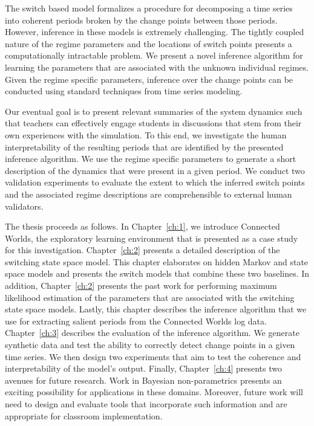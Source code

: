 The switch based model formalizes a procedure for decomposing a time series into coherent periods broken by the change points between those periods. However, inference in these models is extremely challenging. The tightly coupled nature of the regime parameters and the locations of switch points presents a computationally intractable problem. We present a novel inference algorithm for learning the parameters that are associated with the unknown individual regimes. Given the regime specific parameters, inference over the change points can be conducted using standard techniques from time series modeling.

Our eventual goal is to present relevant summaries of the system dynamics such that teachers can effectively engage students in discussions that stem from their own experiences with the simulation. To this end, we investigate the human interpretability of the resulting periods that are identified by the presented inference algorithm. We use the regime specific parameters to generate a short description of the dynamics that were present in a given period. We conduct two validation experiments to evaluate the extent to which the inferred switch points and the associated regime descriptions are comprehensible to external human validators.

The thesis proceeds as follows. In Chapter~\ref{ch:1}, we introduce Connected Worlds, the exploratory learning environment that is presented as a case study for this investigation. Chapter~\ref{ch:2} presents a detailed description of the switching state space model. This chapter elaborates on hidden Markov and state space models and presents the switch models that combine these two baselines. In addition, Chapter~\ref{ch:2} presents the past work for performing maximum likelihood estimation of the parameters that are associated with the switching state space models. Lastly, this chapter describes the inference algorithm that we use for extracting salient periods from the Connected Worlds log data. Chapter~\ref{ch:3} describes the evaluation of the inference algorithm. We generate synthetic data and test the ability to correctly detect change points in a given time series. We then design two experiments that aim to test the coherence and interpretability of the model's output. Finally, Chapter~\ref{ch:4} presents two avenues for future research. Work in Bayesian non-parametrics presents an exciting possibility for applications in these domains. Moreover, future work will need to design and evaluate tools that incorporate such information and are appropriate for classroom implementation.



